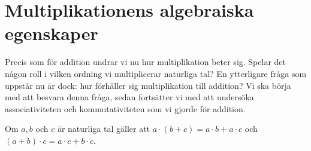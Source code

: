 \section{Multiplikationens algebraiska egenskaper}
Precis som för addition undrar vi nu hur multiplikation beter sig.
Spelar det någon roll i vilken ordning vi multiplicerar naturliga tal?
En ytterligare fråga som uppstår nu är dock: hur förhåller sig multiplikation
till addition?
Vi ska börja med att besvara denna fråga, sedan fortsätter vi med att undersöka
associativiteten och kommutativiteten som vi gjorde för addition.
\begin{theorem}[Distributivitet]\label{thm:NaturligaDistributivitet}
  Om \(a,b\) och \(c\) är naturliga tal gäller att
  \(a\cdot(b+c) = a\cdot b + a\cdot c\) och \((a+b)\cdot c = a\cdot c +
  b\cdot c\).
\end{theorem}
